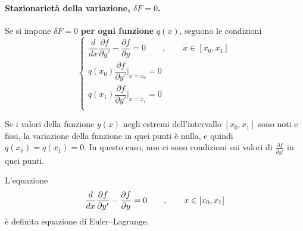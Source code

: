 \paragraph{Stazionarietà della variazione, $\delta F = 0$.}
Se si impone $\delta F = 0$ \textbf{per ogni funzione} $q(x)$, seguono le condizioni
\begin{equation}
\begin{cases}
    \dfrac{d}{dx} \dfrac{\partial f}{\partial y'} - \dfrac{\partial f}{\partial y} = 0 \qquad , \qquad x \in [x_0, x_1] \\
    q(x_0) \dfrac{\partial f}{\partial y'}\bigg|_{x=x_0} = 0 \\
    q(x_1) \dfrac{\partial f}{\partial y'}\bigg|_{x=x_1} = 0 \\
\end{cases}
\end{equation}

\noindent
Se i valori della funzione $y(x)$ negli estremi dell'intervallo $[x_0, x_1]$ sono noti e fissi, la variazione della funzione in quei punti è nulla, e quindi $q(x_0) = q(x_1) = 0$. In questo caso, non ci sono condizioni sui valori di $\frac{\partial f}{\partial y'}$ in quei punti.

\begin{definition}
L'equazione
\begin{equation}
    \dfrac{d}{dx} \dfrac{\partial f}{\partial y'} - \dfrac{\partial f}{\partial y} = 0 \qquad , \qquad x \in [x_0, x_1] \\
\end{equation}
è definita equazione di Euler--Lagrange.
\end{definition}

